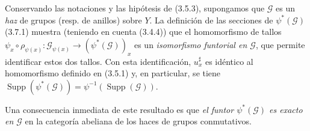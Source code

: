 \begin{env}[3.7.2]
\label{0.3.7.2-fr}
Conservando las notaciones y las hipótesis de (3.5.3), supongamos que
$\mathcal{G}$ es un \emph{haz} de grupos (resp. de anillos) sobre $Y$.
La definición de las secciones de $\psi^*(\mathcal{G})$ (3.7.1) muestra
(teniendo en cuenta (3.4.4)) que el homomorfismo de tallos
$\psi_x\circ\rho_{\psi(x)}:\mathcal{G}_{\psi(x)}\to
(\psi^*(\mathcal{G}))_x$ es un \emph{isomorfismo funtorial en
$\mathcal{G}$}, que permite identificar estos dos tallos. Con esta
identificación, $u_x^\sharp$ es idéntico al homomorfismo definido en
(3.5.1) y, en particular, se tiene
$\operatorname{Supp}(\psi^*(\mathcal{G}))=
\psi^{-1}(\operatorname{Supp}(\mathcal{G}))$.

Una consecuencia inmediata de este resultado es que \emph{el funtor
$\psi^*(\mathcal{G})$ es exacto en $\mathcal{G}$} en la categoría abeliana
de los haces de grupos conmutativos.
\end{env}
